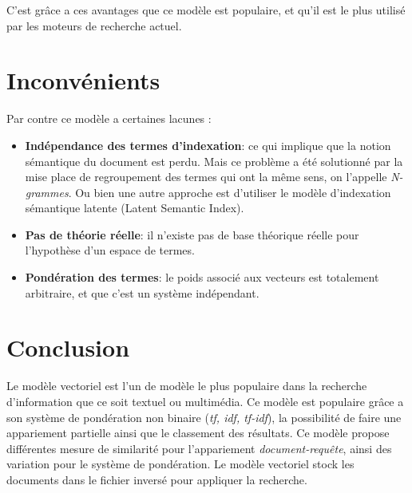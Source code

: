 C'est grâce a ces avantages que ce modèle est populaire, et qu'il est le plus utilisé par les moteurs de recherche actuel.

\section{Inconvénients}
Par contre ce modèle a certaines lacunes :
\begin{itemize}
    \item \textbf{Indépendance des termes d'indexation}: ce qui implique que la notion sémantique du document est perdu. Mais ce problème a été solutionné par la mise place de regroupement des termes qui ont la même sens, on l'appelle \emph{N-grammes}. Ou bien une autre approche est d'utiliser le modèle d’indexation sémantique latente (Latent Semantic Index).
    \item \textbf{Pas de théorie réelle}: il n'existe pas de base théorique réelle pour l'hypothèse d'un espace de termes.
    \item \textbf{Pondération des termes}: le poids associé aux vecteurs est totalement arbitraire, et que c'est un système indépendant.
\end{itemize}

\section{Conclusion}
Le modèle vectoriel est l'un de modèle le plus populaire dans la recherche d'information que ce soit textuel ou multimédia. Ce modèle est populaire grâce a son système de pondération non binaire (\emph{tf, idf, tf-idf}), la possibilité de faire une appariement partielle ainsi que le classement des résultats. Ce modèle propose différentes mesure de similarité pour l’appariement \emph{document-requête}, ainsi des variation pour le système de pondération. Le modèle vectoriel stock les documents dans le fichier inversé pour appliquer la recherche.